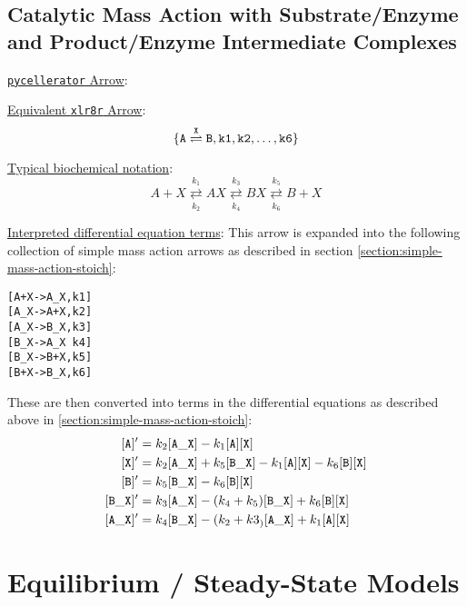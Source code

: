 \subsection{Catalytic Mass Action with Substrate/Enzyme and Product/Enzyme Intermediate Complexes}
\label{section:cat-mass-action-two-complex}
\underline{{\tt pycellerator} Arrow}: \begin{center}
\fbox{\tt 
[A :=> B, mod[X], rates[k1, k2, k3, k4, k5, k6]]
} 
\end{center}

\underline{Equivalent {\tt xlr8r} Arrow}:
$$\tt\{A \overset{X}{\rightleftharpoons} B,k1,k2,\dots,k6 \}$$

\underline{Typical biochemical notation}:
$$ A+X\underset{k_2}{\overset{k_1}  \rightleftarrows } AX \underset{k_4}{ \overset{k_3}{\rightleftarrows} } BX \underset{k_6}{\overset{k_5}{\rightleftarrows}} B+X$$


\underline{Interpreted differential equation terms}:
This arrow is expanded into the following collection of simple mass action arrows as described in section \ref{section:simple-mass-action-stoich}:
\begin{center}
{\tt [A+X->A\_X,k1]}\\
{\tt [A\_X->A+X,k2]}\\
{\tt [A\_X->B\_X,k3]}\\
{\tt [B\_X->A\_X\,k4]}\\
{\tt [B\_X->B+X,k5]}\\
{\tt [B+X->B\_X,k6]}
\end{center}
These are then converted into terms in the differential equations as described above in \ref{section:simple-mass-action-stoich}:
\begin{align*}
{\tt [A]'}    &= k_2{\tt [A\_X]} - k_1 {\tt [A][X]}\\
{\tt [X]'}    &= k_2{\tt [A\_X]} + k_5 {\tt [B\_X]} - k_1 {\tt [A][X]} - k_6 {\tt [B][X]}\\
{\tt [B]'}    &= k_5{\tt [B\_X]} - k_6 {\tt [B][X]}\\
{\tt [B\_X]'} &= k_3{\tt [A\_X]} - (k_4+k_5) {\tt [B\_X]} + k_6 {\tt [B][X]}\\
{\tt [A\_X]'} &= k_4{\tt [B\_X]} - (k_2+k3_) {\tt [A\_X]} + k_1 {\tt [A][X]}
\end{align*}



\section{Equilibrium / Steady-State Models}
